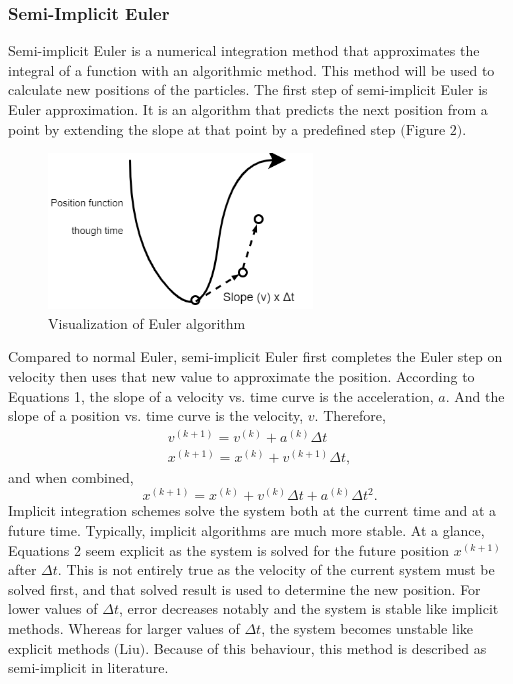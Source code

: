 \documentclass[12pt, letterpaper]{article}
\begin{document}
\subsubsection{Semi-Implicit Euler}
\hspace{\parindent} Semi-implicit Euler is a numerical integration method that approximates the integral of a function with an algorithmic method. This method will be used to calculate new positions of the particles. The first step of semi-implicit Euler is Euler approximation. It is an algorithm that predicts the next position from a point by extending the slope at that point by a predefined step $\text{(Figure 2)}$. 
\begin{figure}[H]
    \centering
    \includegraphics[width=7cm]{euler.png}
    \caption{Visualization of Euler algorithm}
    \label{fig:my_label}
\end{figure}
\noindent Compared to normal Euler, semi-implicit Euler first completes the Euler step on velocity then uses that new value to approximate the position. According to Equations 1, the slope of a velocity vs. time curve is the acceleration, $a$. And the slope of a position vs. time curve is the velocity, $v$. Therefore,
\begin{equation}
    \begin{gathered}
        v^{(k+1)}= v^{(k)} + a^{(k)}\Delta t \\
        x^{(k+1)}= x^{(k)} + v^{(k + 1)}\Delta t,
    \end{gathered}
\end{equation}
and when combined, 
\begin{equation}
    x^{(k+1)} = x^{(k)} + v^{(k)}\Delta t + a^{(k)}\Delta t^{2}.
\end{equation}
Implicit integration schemes solve the system both at the current time and at a future time. Typically, implicit algorithms are much more stable. At a glance, Equations 2 seem explicit as the system is solved for the future position $x^{(k+1)}$ after $\Delta t$. This is not entirely true as the velocity of the current system must be solved first, and that solved result is used to determine the new position. For lower values of $\Delta t$, error decreases notably and the system is stable like  implicit methods. Whereas for larger values of $\Delta t$, the system becomes unstable like explicit methods $\text{(Liu)}$. Because of this behaviour, this method is described as semi-implicit in literature. 
\end{document}
